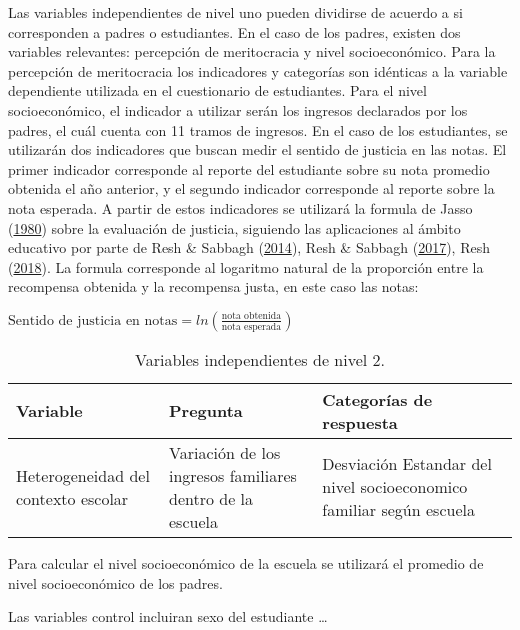 \documentclass[
  12pt,
]{article}
\begin{document}
Las variables independientes de nivel uno pueden dividirse de acuerdo a
si corresponden a padres o estudiantes. En el caso de los padres,
existen dos variables relevantes: percepción de meritocracia y nivel
socioeconómico. Para la percepción de meritocracia los indicadores y
categorías son idénticas a la variable dependiente utilizada en el
cuestionario de estudiantes. Para el nivel socioeconómico, el indicador
a utilizar serán los ingresos declarados por los padres, el cuál cuenta
con 11 tramos de ingresos. En el caso de los estudiantes, se utilizarán
dos indicadores que buscan medir el sentido de justicia en las notas. El
primer indicador corresponde al reporte del estudiante sobre su nota
promedio obtenida el año anterior, y el segundo indicador corresponde al
reporte sobre la nota esperada. A partir de estos indicadores se
utilizará la formula de Jasso
(\protect\hyperlink{ref-jasso_New_1980}{1980}) sobre la evaluación de
justicia, siguiendo las aplicaciones al ámbito educativo por parte de
Resh \& Sabbagh (\protect\hyperlink{ref-resh_Sense_2014}{2014}), Resh \&
Sabbagh (\protect\hyperlink{ref-resh_Sense_2017}{2017}), Resh
(\protect\hyperlink{ref-resh_Sense_2018}{2018}). La formula corresponde
al logaritmo natural de la proporción entre la recompensa obtenida y la
recompensa justa, en este caso las notas:

\(\text{Sentido de justicia en notas}= ln(\frac{\text{nota obtenida}}{\text{nota esperada}})\)

\begin{table}[!h]

\caption{\label{tab:table-independientesn2}Variables independientes de nivel 2.}
\centering
\fontsize{10}{12}\selectfont
\begin{tabu} to 
\toprule
Variable & Pregunta & Categorías de respuesta\\
\midrule
Heterogeneidad del contexto escolar & Variación de los ingresos familiares dentro de la escuela & Desviación Estandar del nivel socioeconomico familiar según escuela\\
\bottomrule
\end{tabu}
\end{table}

Para calcular el nivel socioeconómico de la escuela se utilizará el
promedio de nivel socioeconómico de los padres.

Las variables control incluiran sexo del estudiante \ldots{}
\end{document}
